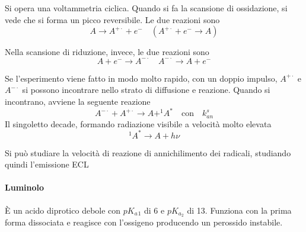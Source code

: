 Si opera una voltammetria ciclica.
Quando si fa la scansione di ossidazione, si vede che si forma un picco reversibile. Le due reazioni sono
\[
A \rightarrow A^{+ \cdot} + e^- \quad (A^{+ \cdot} + e^- \rightarrow A)
\]

Nella scansione di riduzione, invece, le due reazioni sono
\[
A + e^- \rightarrow A^{- \cdot} \quad A^{- \cdot} \rightarrow A + e^-
\]

Se l'esperimento viene fatto in modo molto rapido, con un doppio impulso, $A^{+ \cdot}$ e $A^{- \cdot}$ si possono incontrare nello strato di diffusione e reazione.
Quando si incontrano, avviene la seguente reazione
\[
A^{- \cdot} + A^{+ \cdot} \rightarrow A + ^1A^{\ast} \quad \text{con} \quad k_{an}^s
\]
Il singoletto decade, formando radiazione visibile a velocità molto elevata
\[
^1A^{\ast} \rightarrow A + h \nu
\]

Si può studiare la velocità di reazione di annichilimento dei radicali, studiando quindi l'emissione ECL

\paragraph{Luminolo}
È un acido diprotico debole con $pK_a{_1}$ di 6 e $pK_{a_2}$ di 13.
Funziona con la prima forma dissociata e reagisce con l'ossigeno producendo un perossido instabile.

